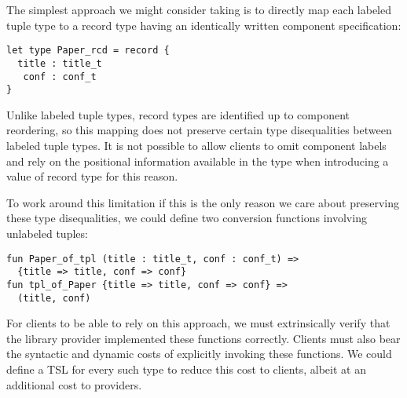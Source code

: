 The simplest approach we might consider taking is to directly map each labeled tuple type to a record type having an identically written component specification:
\begin{lstlisting}[numbers=none]
let type Paper_rcd = record {
  title : title_t
   conf : conf_t 
}\end{lstlisting}
Unlike labeled tuple types, record types are identified up to component reordering, so this mapping does not preserve certain type disequalities between labeled tuple types. It is not  possible to allow clients to omit component labels and rely on the positional information available in the type when introducing a value of record type for this reason.%

To work around this limitation if this is the only reason we care about preserving these type disequalities, we could define two conversion functions involving unlabeled tuples:
\begin{lstlisting}[numbers=none]
fun Paper_of_tpl (title : title_t, conf : conf_t) => 
  {title => title, conf => conf}
fun tpl_of_Paper {title => title, conf => conf} =>
  (title, conf)
\end{lstlisting}
For clients to be able to rely on this approach, we must extrinsically verify that the library provider implemented these functions correctly. Clients must also bear the syntactic and dynamic costs of explicitly invoking these functions. We could define a TSL for every such type to reduce this cost to clients, albeit at an additional cost to providers.  %

